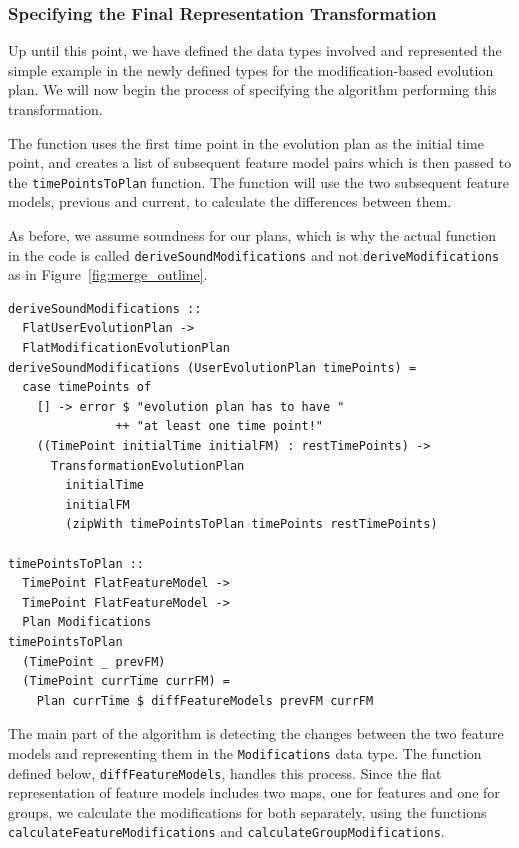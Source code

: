 \documentclass[a4paper,english]{ifimaster}
\begin{document}
\subsubsection{Specifying the Final Representation Transformation}%
\label{ssub:specifying_the_final_representation_transformation}

Up until this point, we have defined the data types involved and represented the simple example in the newly defined types for the modification-based evolution plan. We will now begin the process of specifying the algorithm performing this transformation. 

The function uses the first time point in the evolution plan as the initial time point, and creates a list of subsequent feature model pairs which is then passed to the \texttt{time\-Points\-To\-Plan} function. The function will use the two subsequent feature models, previous and current, to calculate the differences between them.

As before, we assume soundness for our plans, which is why the actual function in the code is called \texttt{derive\-Sound\-Modifications} and not \texttt{derive\-Modifications} as in Figure~\ref{fig:merge_outline}.

\begin{verbatim}
deriveSoundModifications :: 
  FlatUserEvolutionPlan -> 
  FlatModificationEvolutionPlan
deriveSoundModifications (UserEvolutionPlan timePoints) = 
  case timePoints of
    [] -> error $ "evolution plan has to have " 
               ++ "at least one time point!"
    ((TimePoint initialTime initialFM) : restTimePoints) ->
      TransformationEvolutionPlan
        initialTime
        initialFM
        (zipWith timePointsToPlan timePoints restTimePoints)

timePointsToPlan ::
  TimePoint FlatFeatureModel -> 
  TimePoint FlatFeatureModel -> 
  Plan Modifications
timePointsToPlan 
  (TimePoint _ prevFM) 
  (TimePoint currTime currFM) =
    Plan currTime $ diffFeatureModels prevFM currFM
\end{verbatim}

The main part of the algorithm is detecting the changes between the two feature models and representing them in the \texttt{Modifications} data type. The function defined below, \texttt{diff\-Feature\-Models}, handles this process. Since the flat representation of feature models includes two maps, one for features and one for groups, we calculate the modifications for both separately, using the functions \texttt{calculate\-Feature\-Modifications} and \texttt{calculate\-Group\-Modifications}.
\end{document}
